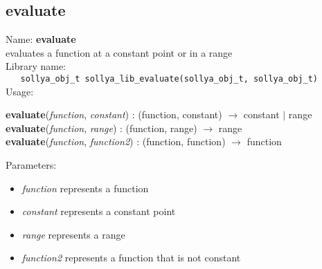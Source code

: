 \subsection{evaluate}
\label{labevaluate}
\noindent Name: \textbf{evaluate}\\
\phantom{aaa}evaluates a function at a constant point or in a range\\[0.2cm]
\noindent Library name:\\
\verb|   sollya_obj_t sollya_lib_evaluate(sollya_obj_t, sollya_obj_t)|\\[0.2cm]
\noindent Usage: 
\begin{center}
\textbf{evaluate}(\emph{function}, \emph{constant}) : (\textsf{function}, \textsf{constant}) $\rightarrow$ \textsf{constant} $|$ \textsf{range}\\
\textbf{evaluate}(\emph{function}, \emph{range}) : (\textsf{function}, \textsf{range}) $\rightarrow$ \textsf{range}\\
\textbf{evaluate}(\emph{function}, \emph{function2}) : (\textsf{function}, \textsf{function}) $\rightarrow$ \textsf{function}\\
\end{center}
Parameters: 
\begin{itemize}
\item \emph{function} represents a function
\item \emph{constant} represents a constant point
\item \emph{range} represents a range
\item \emph{function2} represents a function that is not constant
\end{itemize}
